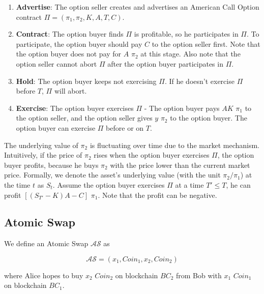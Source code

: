\begin{enumerate}
    \item \textbf{Advertise}: The option seller creates and advertises an American Call Option contract $\Pi = (\pi_1, \pi_2, K, A, T, C)$.
    \item \textbf{Contract}: The option buyer finds $\Pi$ is profitable, so he participates in $\Pi$.
    To participate, the option buyer should pay $C$ to the option seller first.
    Note that the option buyer does not pay for $A$ $\pi_2$ at this stage.
    Also note that the option seller cannot abort $\Pi$ after the option buyer participates in $\Pi$.
    \item \textbf{Hold}: The option buyer keeps not exercising $\Pi$. If he doesn't exercise $\Pi$ before $T$, $\Pi$ will abort.
    \item \textbf{Exercise}: The option buyer exercises $\Pi$ - The option buyer pays $AK$ $\pi_1$ to the option seller, and the option seller gives $y$ $\pi_2$ to the option buyer. The option buyer can exercise $\Pi$ before or on $T$.
\end{enumerate}

The underlying value of $\pi_2$ is fluctuating over time due to the market mechanism.
Intuitively, if the price of $\pi_2$ rises when the option buyer exercises $\Pi$, the option buyer profits, because he buys $\pi_2$ with the price lower than the current market price.
Formally, we denote the asset's underlying value (with the unit $\pi_2 / \pi_1$) at the time $t$ as $S_t$.
Assume the option buyer exercises $\Pi$ at a time $T' \leq T$, he can profit $[(S_{T'} - K) A - C]$ $\pi_1$.
Note that the profit can be negative.















\subsection{Atomic Swap}

\begin{definition}
We define an Atomic Swap $\mathcal{AS}$ as

$$\mathcal{AS} = (x_1, Coin_1, x_2, Coin_2)$$

where Alice hopes to buy $x_2$ $Coin_2$ on blockchain $BC_2$ from Bob with $x_1$ $Coin_1$ on blockchain $BC_1$.
\end{definition}

